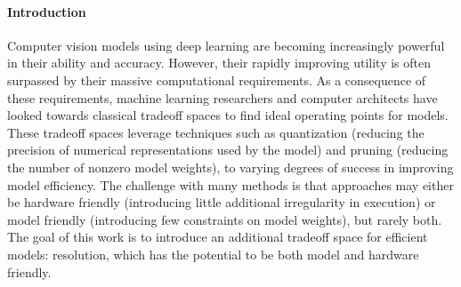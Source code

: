 \paragraph{Introduction}
Computer vision models using deep learning are becoming increasingly powerful in their ability and accuracy.
However, their rapidly improving utility is often surpassed by their massive computational requirements.
As a consequence of these requirements, machine learning researchers and computer architects have looked towards classical tradeoff spaces to find ideal operating points for models.
These tradeoff spaces leverage techniques such as quantization (reducing the precision of numerical representations used by the model) and pruning (reducing the number of nonzero model weights), to varying degrees of success in improving model efficiency.
The challenge with many methods is that approaches may either be hardware friendly (introducing little additional irregularity in execution) or model friendly (introducing few constraints on model weights), but rarely both.
The goal of this work is to introduce an additional tradeoff space for efficient models: resolution, which has the potential to be both model and hardware friendly.


%

